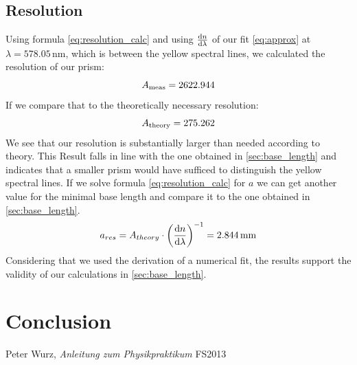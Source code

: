 \documentclass{scrreprt}
\newcommand{\unit}[1]{\ensuremath{\, \mathrm{#1}}}
\begin{document}
\subsection{Resolution}
Using formula \ref{eq:resolution_calc} and using $\frac{\dif{n}}{\dif{\lambda}}$ of our fit \ref{eq:approx} at $\lambda = 578.05 \unit{nm}$, which is between the yellow spectral lines, we calculated the resolution of our prism:
\begin{equation}
	A_{\text{meas}} = 2622.944
	\notag
\end{equation}
If we compare that to the theoretically necessary resolution:
\begin{equation}
	A_{\text{theory}} = 275.262
	\notag
\end{equation}
We see that our resolution is substantially larger than needed according to theory. This Result falls in line with the one obtained in \ref{sec:base_length} and indicates that a smaller prism would have sufficed to distinguish the yellow spectral lines. If we solve formula \ref{eq:resolution_calc} for $a$ we can get another value for the minimal base length and compare it to the one obtained in \ref{sec:base_length}.
\begin{equation}
	a_{res} = A_{theory} \cdot \left(\frac{\dif{n}}{\dif{\lambda}}\right)^{-1} = 2.844 \unit{mm}
\notag
\end{equation}
Considering that we used the derivation of a numerical fit, the results support the validity of our calculations in \ref{sec:base_length}.



\section{Conclusion}

\begin{thebibliography}{9}

  Peter Wurz,
  \emph{Anleitung zum Physikpraktikum}
  FS2013

\end{thebibliography}
\end{document}
